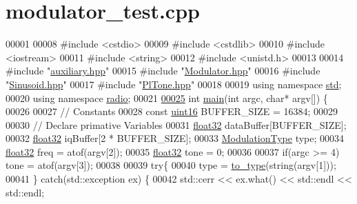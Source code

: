 \hypertarget{modulator__test_8cpp_source}{\section{modulator\+\_\+test.\+cpp}
\label{modulator__test_8cpp_source}
}

\begin{DoxyCode}
00001 
00008 \textcolor{preprocessor}{#include <cstdio>}
00009 \textcolor{preprocessor}{#include <cstdlib>}
00010 \textcolor{preprocessor}{#include <iostream>}
00011 \textcolor{preprocessor}{#include <string>}
00012 \textcolor{preprocessor}{#include <unistd.h>}
00013 
00014 \textcolor{preprocessor}{#include "\hyperlink{auxiliary_8hpp}{auxiliary.hpp}"}
00015 \textcolor{preprocessor}{#include "\hyperlink{Modulator_8hpp}{Modulator.hpp}"}
00016 \textcolor{preprocessor}{#include "\hyperlink{Sinusoid_8hpp}{Sinusoid.hpp}"}
00017 \textcolor{preprocessor}{#include "\hyperlink{PlTone_8hpp}{PlTone.hpp}"}
00018 
00019 \textcolor{keyword}{using namespace }\hyperlink{namespacestd}{std};
00020 \textcolor{keyword}{using namespace }\hyperlink{namespaceradio}{radio};
00021 
\hypertarget{modulator__test_8cpp_source_l00025}{}\hyperlink{modulator__test_8cpp_a0ddf1224851353fc92bfbff6f499fa97}{00025} \textcolor{keywordtype}{int} \hyperlink{modulator__test_8cpp_a0ddf1224851353fc92bfbff6f499fa97}{main}(\textcolor{keywordtype}{int} argc, \textcolor{keywordtype}{char}* argv[]) \{
00026 
00027     \textcolor{comment}{// Constants}
00028     \textcolor{keyword}{const} \hyperlink{definitions_8hpp_a05f6b0ae8f6a6e135b0e290c25fe0e4e}{uint16} BUFFER\_SIZE = 16384;
00029 
00030     \textcolor{comment}{// Declare primative Variables}
00031     \hyperlink{definitions_8hpp_aacdc525d6f7bddb3ae95d5c311bd06a1}{float32} dataBuffer[BUFFER\_SIZE];
00032     \hyperlink{definitions_8hpp_aacdc525d6f7bddb3ae95d5c311bd06a1}{float32} iqBuffer[2 * BUFFER\_SIZE];
00033     \hyperlink{namespaceradio_a46fb7299001138f28b7f69975c58399e}{ModulationType} type;
00034     \hyperlink{definitions_8hpp_aacdc525d6f7bddb3ae95d5c311bd06a1}{float32} freq = atof(argv[2]);
00035     \hyperlink{definitions_8hpp_aacdc525d6f7bddb3ae95d5c311bd06a1}{float32} tone = 0;
00036 
00037     \textcolor{keywordflow}{if}(argc >= 4) tone = atof(argv[3]);
00038 
00039     \textcolor{keywordflow}{try}\{
00040         type = \hyperlink{namespaceradio_a402fe28e2e2bb2be7a0d2d9f74cc640d}{to\_type}(\textcolor{keywordtype}{string}(argv[1]));
00041     \} \textcolor{keywordflow}{catch}(std::exception ex) \{
00042         std::cerr << ex.what() << std::endl << std::endl;

\end{DoxyCode}
